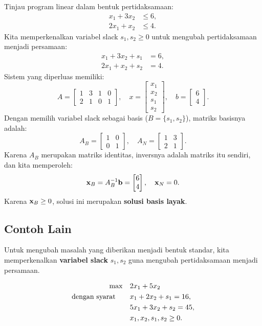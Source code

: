 Tinjau program linear dalam bentuk pertidaksamaan:
\[
\begin{aligned}
    x_1 + 3x_2 &\leq 6, \\
    2x_1 + x_2 &\leq 4.
\end{aligned}
\]
Kita memperkenalkan variabel slack \( s_1, s_2 \geq 0 \) untuk mengubah pertidaksamaan menjadi persamaan:
\[
\begin{aligned}
    x_1 + 3x_2 + s_1 &= 6, \\
    2x_1 + x_2 + s_2 &= 4.
\end{aligned}
\]
Sistem yang diperluas memiliki:
\[
A =
\begin{bmatrix}
    1 & 3 & 1 & 0 \\
    2 & 1 & 0 & 1
\end{bmatrix}, \quad
x =
\begin{bmatrix}
    x_1 \\ x_2 \\ s_1 \\ s_2
\end{bmatrix}, \quad
b =
\begin{bmatrix}
    6 \\ 4
\end{bmatrix}.
\]
Dengan memilih variabel slack sebagai basis (\(B= \{s_1, s_2\} \)), matriks basisnya adalah:
\[
A_B =
\begin{bmatrix}
    1 & 0 \\
    0 & 1
\end{bmatrix}, \quad A_N =
\begin{bmatrix}
    1 & 3 \\
    2 & 1
\end{bmatrix}.
\]
Karena \( A_B \) merupakan matriks identitas, inversnya adalah matriks itu sendiri, dan kita memperoleh:
\[
\mathbf{x}_B = A_B^{-1}\mathbf{b}= 
\begin{bmatrix}
    6 \\ 4
\end{bmatrix}, \quad \mathbf{x}_N = 0.
\]
Karena \( \mathbf{x}_B \geq 0 \), solusi ini merupakan \textbf{solusi basis layak}.

\subsection{Contoh Lain}

Untuk mengubah masalah yang diberikan menjadi bentuk standar, kita memperkenalkan \textbf{variabel slack} \( s_1, s_2 \) guna mengubah pertidaksamaan menjadi persamaan.

\[
\begin{aligned}
    \max \quad & 2 x_1 + 5 x_2 \\
    \mbox{dengan syarat}\quad \quad 
    & x_1 + 2x_2 + s_1 = 16, \\
    & 5x_1 + 3x_2 + s_2 = 45, \\
    & x_1, x_2, s_1, s_2 \geq 0.
\end{aligned}
\]

